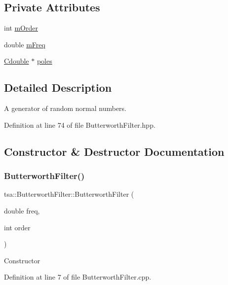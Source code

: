 \subsection*{Private Attributes}
\begin{DoxyCompactItemize}
\item 
int \hyperlink{classtsa_1_1_butterworth_filter_ad81a41345c8b088c6aa02f138b39348b}{m\+Order}
\item 
double \hyperlink{classtsa_1_1_butterworth_filter_a7bff04791bdba8c8b668e8b664f01e60}{m\+Freq}
\item 
\hyperlink{namespacetsa_a7b1f40fa90474b78dd0ab472b7c37547}{Cdouble} $\ast$ \hyperlink{classtsa_1_1_butterworth_filter_a35cbb21e7a98ac4214147afd1aa5b1fe}{poles}
\end{DoxyCompactItemize}


\subsection{Detailed Description}
A generator of random normal numbers. 

Definition at line 74 of file Butterworth\+Filter.\+hpp.



\subsection{Constructor \& Destructor Documentation}
\mbox{\label{classtsa_1_1_butterworth_filter_a593153a0d04510ed85ddf1464c68dc74}} 
\subsubsection{\texorpdfstring{Butterworth\+Filter()}{ButterworthFilter()}}
{\footnotesize\ttfamily tsa\+::\+Butterworth\+Filter\+::\+Butterworth\+Filter (\begin{DoxyParamCaption}\item[{double}]{freq,  }\item[{int}]{order }\end{DoxyParamCaption})}

Constructor 

Definition at line 7 of file Butterworth\+Filter.\+cpp.

